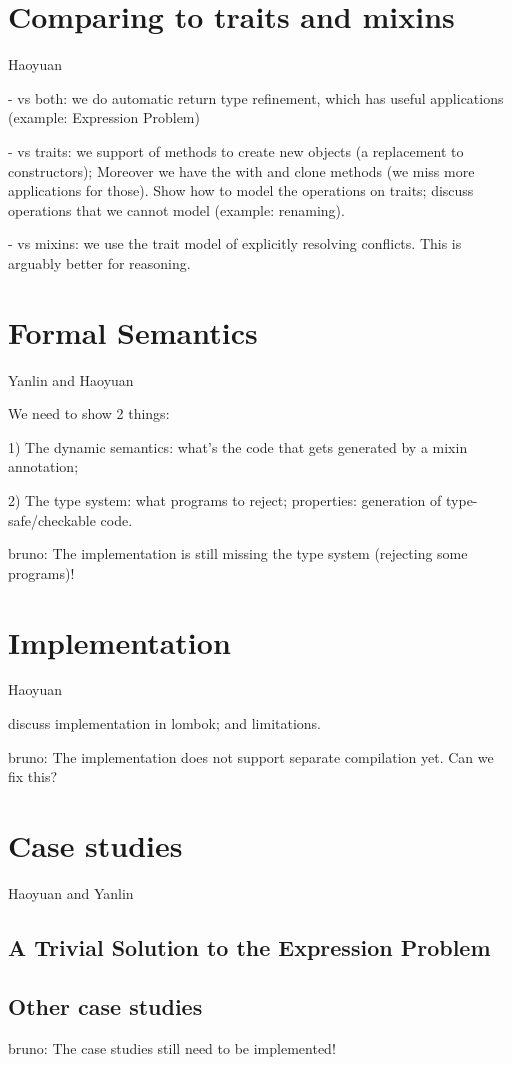 \documentclass[preprint]{llncs}
\newcommand{\authornote}[3]{{\color{#2} {\sc #1}: #3}}
\newcommand\bruno[1]{\authornote{bruno}{red}{#1}}
\begin{document}
\section{Comparing to traits and mixins}
Haoyuan

   - vs both: we do automatic return type refinement, which has useful applications 
   (example: Expression Problem)

   - vs traits: we support of methods to create new objects (a replacement to constructors);
   Moreover we have the with and clone methods (we miss more applications for those). Show 
   how to model the operations on traits; discuss operations that we cannot model 
   (example: renaming).

   - vs mixins: we use the trait model of explicitly resolving conflicts. This is arguably 
   better for reasoning. 

\section{Formal Semantics}\label{sec:typesafety}
Yanlin and Haoyuan

We need to show 2 things:

1) The dynamic semantics: what's the code that gets generated by a mixin annotation;

2) The type system: what programs to reject; properties: generation of type-safe/checkable code.

\bruno{The implementation is still missing the type system (rejecting some programs)!}

\section{Implementation}
Haoyuan

discuss implementation in lombok; and limitations.

\bruno{The implementation does not support separate compilation yet. Can we fix this?}

\section{Case studies}
Haoyuan and Yanlin

\subsection{A Trivial Solution to the Expression Problem}

\subsection{Other case studies} 
\bruno{The case studies still need to be implemented!}
\end{document}
